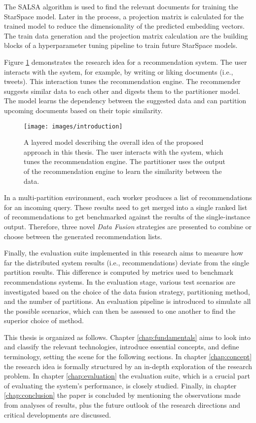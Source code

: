 The SALSA algorithm is used to find the relevant documents for training the StarSpace model. Later in the process, a projection matrix is calculated for the trained model to reduce the dimensionality of the predicted embedding vectors. The train data generation and the projection matrix calculation are the building blocks of a hyperparameter tuning pipeline to train future StarSpace models.


Figure \ref{fig:introduction} demonstrates the research idea for a recommendation system. The user interacts with the system, for example, by writing or liking documents (i.e., tweets). This interaction tunes the recommendation engine. The recommender suggests similar data to each other and digests them to the partitioner model. The model learns the dependency between the suggested data and can partition upcoming documents based on their topic similarity.


\begin{figure}[!htb]
    \centering
    \texttt{[image: images/introduction]}
    \caption{A layered model describing the overall idea of the proposed approach in this thesis. The user interacts with the system, which tunes the recommendation engine. The partitioner uses the output of the recommendation engine to learn the similarity between the data.}
    \label{fig:introduction}
\end{figure}


In a multi-partition environment, each worker produces a list of recommendations for an incoming query. These results need to get merged into a single ranked list of recommendations to get benchmarked against the results of the single-instance output. Therefore, three novel \emph{Data Fusion} strategies are presented to combine or choose between the generated recommendation lists.


Finally, the evaluation suite implemented in this research aims to measure how far the distributed system results (i.e., recommendations) deviate from the single partition results. This difference is computed by metrics used to benchmark recommendations systems. In the evaluation stage, various test scenarios are investigated based on the choice of the data fusion strategy, partitioning method, and the number of partitions. An evaluation pipeline is introduced to simulate all the possible scenarios, which can then be assessed to one another to find the superior choice of method.


This thesis is organized as follows. Chapter \ref{chap:fundamentals} aims to look into and classify the relevant technologies, introduce essential concepts, and define terminology, setting the scene for the following sections. In chapter \ref{chap:concept} the research idea is formally structured by an in-depth exploration of the research problem. In chapter \ref{chap:evaluation} the evaluation suite, which is a crucial part of evaluating the system's performance, is closely studied. Finally, in chapter \ref{chap:conclusion} the paper is concluded by mentioning the observations made from analyses of results, plus the future outlook of the research directions and critical developments are discussed.


